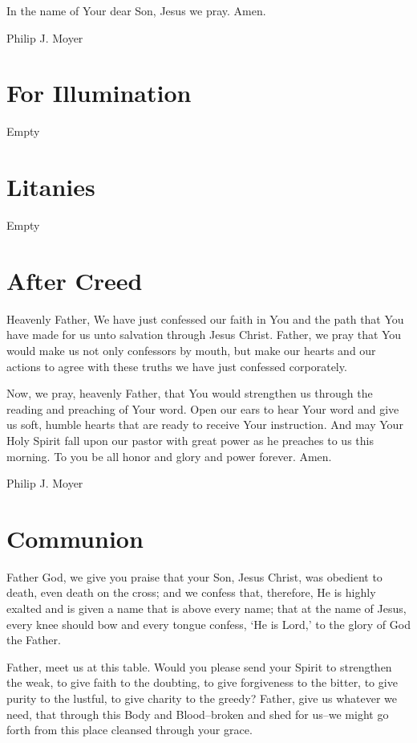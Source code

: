 \documentclass[]{book}
\begin{document}
In the name of Your dear Son, Jesus we pray. Amen.

Philip J. Moyer

\hypertarget{for-illumination}{%
\section{For Illumination}\label{for-illumination}}

Empty

\hypertarget{litanies}{%
\section{Litanies}\label{litanies}}

Empty

\hypertarget{after-creed}{%
\section{After Creed}\label{after-creed}}

Heavenly Father, We have just confessed our faith in You and the path that You have made for us unto salvation through Jesus Christ. Father, we pray that You would make us not only confessors by mouth, but make our hearts and our actions to agree with these truths we have just confessed corporately.

Now, we pray, heavenly Father, that You would strengthen us through the reading and preaching of Your word. Open our ears to hear Your word and give us soft, humble hearts that are ready to receive Your instruction. And may Your Holy Spirit fall upon our pastor with great power as he preaches to us this morning. To you be all honor and glory and power forever. Amen.

Philip J. Moyer

\hypertarget{communion}{%
\section{Communion}\label{communion}}

Father God, we give you praise that your Son, Jesus Christ, was obedient to death, even death on the cross; and we confess that, therefore, He is highly exalted and is given a name that is above every name; that at the name of Jesus, every knee should bow and every tongue confess, `He is Lord,' to the glory of God the Father.

Father, meet us at this table. Would you please send your Spirit to strengthen the weak, to give faith to the doubting, to give forgiveness to the bitter, to give purity to the lustful, to give charity to the greedy? Father, give us whatever we need, that through this Body and Blood--broken and shed for us--we might go forth from this place cleansed through your grace.
\end{document}
